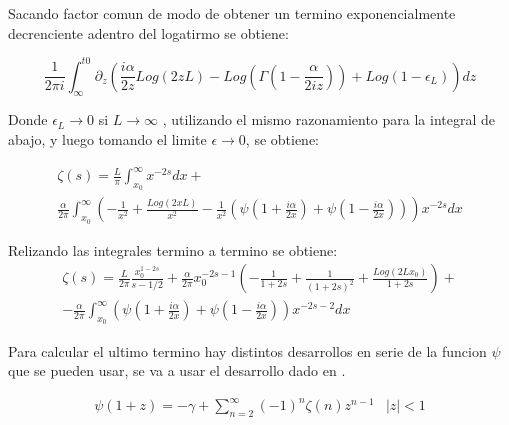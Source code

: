 Sacando factor comun de modo de obtener un termino exponencialmente decrenciente adentro del logatirmo se obtiene:

\begin{equation}
\frac{1}{2 \pi i}  \int _{\infty} ^{t0} 
\partial _{z}
\left(
\frac{i\alpha}{2 z} Log ( 2 z L ) - 
Log \left( \Gamma \left( 1 - \frac{ \alpha}{2 i z} \right) \right) +
Log \left( 1- \epsilon _L \right)
\right)
d z
\end{equation}

Donde $ \epsilon _L \rightarrow 0$ si $L \rightarrow \infty $ , utilizando el mismo razonamiento para la integral de abajo, y luego tomando el limite $\epsilon \rightarrow 0$, se obtiene:

\begin{equation}
\begin{array}{c}
\zeta (s) = 
\frac{L}{\pi}
\int _ {x_0} ^{\infty} x ^{-2s} dx + \\[10pt]
\frac{\alpha}{2 \pi } \int _{x_0} ^{\infty} 
\left(-
\frac{1}{ x ^2} +
\frac{Log \left( 2 x L \right) }{x ^2}  -
\frac{1}{ x ^2 } 
\left(
\psi (1 + \frac{i \alpha}{2 x}) + \psi (1 - \frac{i \alpha}{2 x}) 
\right)
\right)
x ^{-2s} d x
\end{array}
\end{equation}



Relizando las integrales termino a termino se obtiene:
\begin{equation}
\begin{array}{c}
\zeta (s) = 


\frac{L}{2 \pi} \frac{x _0 ^{1-2s}}{s-1/2} + 


\frac{\alpha}{2 \pi} x _{0} ^{-2s-1}
\left( 
	-\frac{1}{1+2s} +
	\frac{1}{(1+2s) ^2} +
	\frac{Log(2 L x _0)}{1+2s} 
	\right) + 

  \\[10pt]


- \frac{\alpha}{2 \pi}
\int _{x_0} ^{\infty} 
\left(
\psi(1 + \frac{i \alpha}{2 x}) +
\psi(1 - \frac{i \alpha}{2 x} )
\right)
x ^{-2s-2}
dx
\end{array}
\end{equation}


Para calcular el ultimo termino hay distintos desarrollos en serie de la funcion $\psi $ que se pueden usar, se va a usar el desarrollo dado en \cite{Nobody06}.

\begin{equation}
\begin{array}{cc}
\psi (1+ z ) = - \gamma + \sum _{n=2} ^{\infty} (-1) ^n \zeta (n) z ^{n-1} & |z| < 1
\end{array}
\end{equation}

